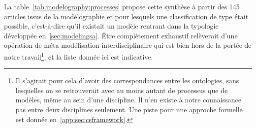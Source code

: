



La table~\ref{tab:modelography:processes} propose cette synthèse à partir des 145 articles issus de la modélographie et pour lesquels une classification de type était possible, c'est-à-dire qu'il existait un modèle rentrant dans la typologie développée en~\ref{sec:modelingsa}. Être complètement exhaustif relèverait d'une opération de méta-modélisation interdisciplinaire qui est bien hors de la portée de notre travail\footnote{Il s'agirait pour cela d'avoir des correspondances entre les ontologies, sans lesquelles on se retrouverait avec au moins autant de processus que de modèles, même au sein d'une discipline. Il n'en existe à notre connaissance pas entre deux disciplines seulement. Une piste pour une approche formelle est donnée en~\ref{app:sec:csframework}.}, et la liste donnée ici est indicative.


